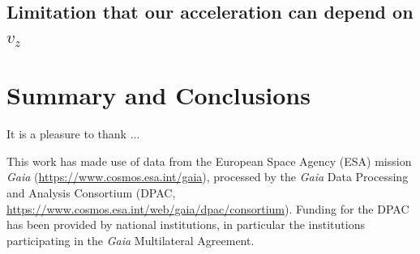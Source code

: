 \subsection{Limitation that our acceleration can depend on $v_z$}


\section{Summary and Conclusions} \label{sec:conclusions}


\begin{acknowledgements}

It is a pleasure to thank ...



This work has made use of data from the European Space Agency (ESA) mission
{\it Gaia} (\url{https://www.cosmos.esa.int/gaia}), processed by the {\it Gaia}
Data Processing and Analysis Consortium (DPAC,
\url{https://www.cosmos.esa.int/web/gaia/dpac/consortium}). Funding for the DPAC
has been provided by national institutions, in particular the institutions
participating in the {\it Gaia} Multilateral Agreement.

\end{acknowledgements}

